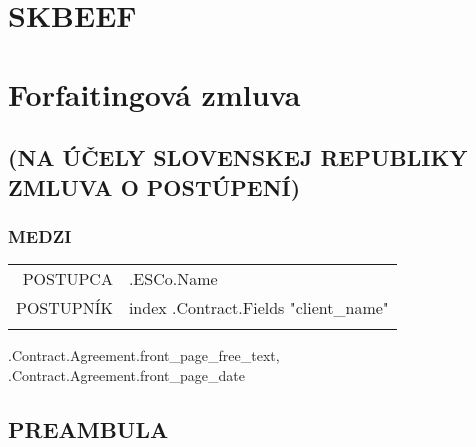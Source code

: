 \documentclass[a4paper]{article}
\begin{document}
\renewcommand\thesection{}
\renewcommand\thesubsection{}
\renewcommand\thesubsubsection{}

\begin{center}

  \vspace*{\fill}
  \section{SKBEEF}
  \section{Forfaitingová zmluva}
  \subsection{(NA ÚČELY SLOVENSKEJ REPUBLIKY ZMLUVA O POSTÚPENÍ)}
  \vspace*{\fill}

  \vspace{8cm}

  \subsubsection{MEDZI}

  \vspace{1cm}

  \begin{tabu}{|r|X[2]|} \tabucline{}

    POSTUPCA&{{.ESCo.Name}}\\\tabucline{}

    POSTUPNÍK&{{index .Contract.Fields "client_name"}}\\\tabucline{}

  \end{tabu}

  \iffalse input forfaitingFields.front_page_free_text value="{{.Contract.Agreement.front_page_free_text}}" \fi {{.Contract.Agreement.front_page_free_text}}, \iffalse input forfaitingFields.front_page_date value="{{.Contract.Agreement.front_page_date}}" type="date" \fi {{.Contract.Agreement.front_page_date}}

\end{center}

\pagebreak

\begin{center}
	\section{PREAMBULA}
\end{center}
\end{document}
